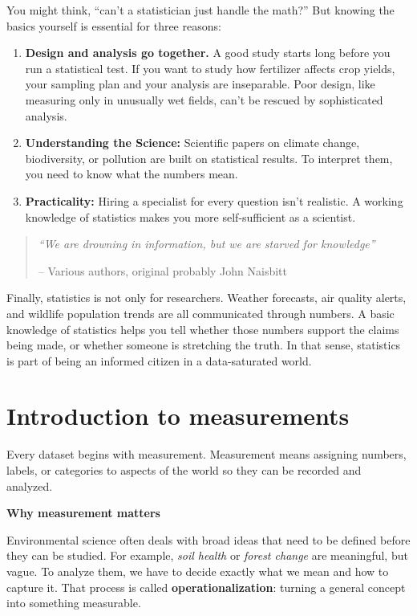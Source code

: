 \documentclass[
  letterpaper,
  DIV=11,
  numbers=noendperiod]{scrreprt}
\begin{document}
You might think, ``can't a statistician just handle the math?'' But
knowing the basics yourself is essential for three reasons:

\begin{enumerate}
\def\labelenumi{\arabic{enumi}.}
\item
  \textbf{Design and analysis go together.} A good study starts long
  before you run a statistical test. If you want to study how fertilizer
  affects crop yields, your sampling plan and your analysis are
  inseparable. Poor design, like measuring only in unusually wet fields,
  can't be rescued by sophisticated analysis.
\item
  \textbf{Understanding the Science:} Scientific papers on climate
  change, biodiversity, or pollution are built on statistical results.
  To interpret them, you need to know what the numbers mean.
\item
  \textbf{Practicality:} Hiring a specialist for every question isn't
  realistic. A working knowledge of statistics makes you more
  self-sufficient as a scientist.
\end{enumerate}

\begin{quote}
\emph{``We are drowning in information, but we are starved for
knowledge''}

-- Various authors, original probably John Naisbitt
\end{quote}

Finally, statistics is not only for researchers. Weather forecasts, air
quality alerts, and wildlife population trends are all communicated
through numbers. A basic knowledge of statistics helps you tell whether
those numbers support the claims being made, or whether someone is
stretching the truth. In that sense, statistics is part of being an
informed citizen in a data-saturated world.

\section{Introduction to
measurements}\label{introduction-to-measurements}

Every dataset begins with measurement. Measurement means assigning
numbers, labels, or categories to aspects of the world so they can be
recorded and analyzed.

\textbf{Why measurement matters}

Environmental science often deals with broad ideas that need to be
defined before they can be studied. For example, \emph{soil health} or
\emph{forest change} are meaningful, but vague. To analyze them, we have
to decide exactly what we mean and how to capture it. That process is
called \textbf{operationalization}: turning a general concept into
something measurable.
\end{document}
